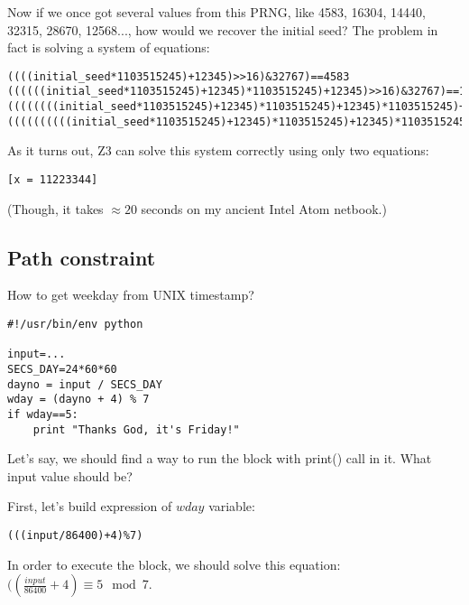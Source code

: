 

Now if we once got several values from this PRNG, like 4583, 16304, 14440, 32315, 28670, 12568..., how would we
recover the initial seed?
The problem in fact is solving a system of equations:

\begin{lstlisting}
((((initial_seed*1103515245)+12345)>>16)&32767)==4583
((((((initial_seed*1103515245)+12345)*1103515245)+12345)>>16)&32767)==16304
((((((((initial_seed*1103515245)+12345)*1103515245)+12345)*1103515245)+12345)>>16)&32767)==14440
((((((((((initial_seed*1103515245)+12345)*1103515245)+12345)*1103515245)+12345)*1103515245)+12345)>>16)&32767)==32315
\end{lstlisting}

As it turns out, Z3 can solve this system correctly using only two equations:



\begin{lstlisting}
[x = 11223344]
\end{lstlisting}

(Though, it takes $\approx 20$ seconds on my ancient Intel Atom netbook.)

\subsection{Path constraint}

How to get weekday from UNIX timestamp?

\begin{lstlisting}
#!/usr/bin/env python

input=...
SECS_DAY=24*60*60
dayno = input / SECS_DAY
wday = (dayno + 4) % 7
if wday==5:
    print "Thanks God, it's Friday!"
\end{lstlisting}

Let's say, we should find a way to run the block with print() call in it.
What input value should be?

First, let's build expression of $wday$ variable:



\begin{lstlisting}
(((input/86400)+4)%7)
\end{lstlisting}

In order to execute the block, we should solve this equation: $((\frac{input}{86400}+4) \equiv 5 \mod 7$.

